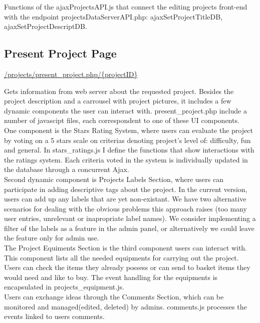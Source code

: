 Functions of the ajaxProjectsAPI.js that connect the editing projects front-end with the endpoint projectsDataServerAPI.php:  ajaxSetProjectTitleDB, ajaxSetProjectDescriptDB. 

 \subsection{Present Project Page}
\url{/projects/present\_project.php/{projectID}}	

Gets information from web server about the requested project.
Besides the project description and a carrousel with project pictures, it includes a few dynamic components the user can interact with. present\_project.php include a number of javascipt files, each correspondent to one of these UI components.\\

One component is the Stars Rating System, where users can evaluate the project by voting on a 5 stars scale on criterias denoting project's level of: difficulty, fun and general. In stars\_ratings.js I define the functions that show interactions with the ratings system. Each criteria voted in the system is individually updated in the database through a concurrent Ajax.\\

Second dynamic component is Projects Labels Section, where users can participate in adding descriptive tags about the project. In the current version, users can add up any labels that are yet non-existant. We have two alternative scenarios for dealing with the obvious problems this approach raises (too many user entries, unrelevant or inapropriate label names). We consider implementing a filter of the labels as a feature in the admin panel, or alternatively we could leave the feature only for admin use. \\

The Project Equiments Section is the third component users can interact with. This component lists all the needed equipments for carrying out the project. Users can check the items they already possess or can send to basket items they would need and like to buy. The event handling for the equipments is encapsulated in projects\_equipment.js. \\

Users can exchange ideas through the Comments Section, which can be monitored and managed(edited, deleted) by admins. comments.js processes the events linked to users comments.\\

